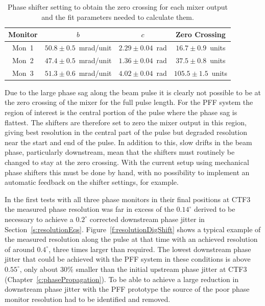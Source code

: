 \begin{table}
  \begin{center}
    \begin{tabular}{|c c c c|}
	   \hline
       Monitor & \(b\) & \(c\) & Zero Crossing \\ \hline
       Mon~1 & \(50.8\pm0.5\)~mrad/unit & \(2.29\pm0.04\)~rad & \(16.7\pm0.9\)~units \\ 
       Mon~2 & \(47.4\pm0.5\)~mrad/unit & \(1.36\pm0.04\)~rad & \(37.5\pm0.8\)~units \\
       Mon~3 & \(51.3\pm0.6\)~mrad/unit & \(4.02\pm0.04\)~rad & \(105.5\pm1.5\)~units \\ \hline
    \end{tabular}
    \caption{Phase shifter setting to obtain the zero crossing for each mixer output and the fit parameters needed to calculate them.}
  	\label{t:calZeroCross}
  \end{center}
\end{table}

Due to the large phase sag along the beam pulse it is clearly not possible to be at the zero crossing of the mixer for the full pulse length. For the PFF system the region of interest is the central portion of the pulse where the phase sag is flattest. The shifters are therefore set to zero the mixer output in this region, giving best resolution in the central part of the pulse but degraded resolution near the start and end of the pulse. In addition to this, slow drifts in the beam phase, particularly downstream, mean that the shifters must routinely be changed to stay at the zero crossing. With the current setup using mechanical phase shifters this must be done by hand, with no possibility to implement an automatic feedback on the shifter settings, for example.


In the first tests with all three phase monitors in their final positions at CTF3 the measured phase resolution was far in excess of the \(0.14^\circ\) derived to be necessary to achieve a \(0.2^\circ\) corrected downstream phase jitter in Section~\ref{s:resolutionEqs}. Figure~\ref{f:resolutionDigShift} shows a typical example of the measured resolution along the pulse at that time with an achieved resolution of around \(0.4^\circ\), three times larger than required. The lowest downstream phase jitter that could be achieved with the PFF system in these conditions is above \(0.55^\circ\), only about 30\% smaller than the initial upstream phase jitter at CTF3 (Chapter~\ref{c:phasePropagation}). To be able to achieve a large reduction in downstream phase jitter with the PFF prototype the source of the poor phase monitor resolution had to be identified and removed.

